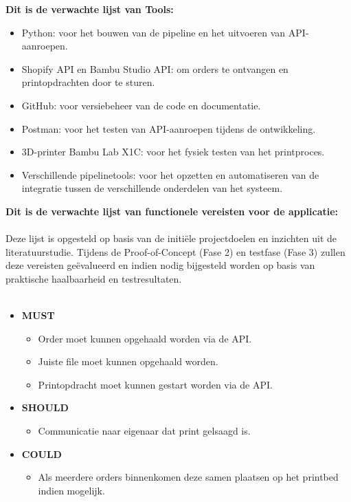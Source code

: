 \vspace{1em}
\textbf{Dit is de verwachte lijst van Tools:}\\
\begin{itemize}
    \item Python: voor het bouwen van de pipeline en het uitvoeren van API-aanroepen.
    \item Shopify API en Bambu Studio API: om orders te ontvangen en printopdrachten door te sturen.
    \item GitHub: voor versiebeheer van de code en documentatie.
    \item Postman: voor het testen van API-aanroepen tijdens de ontwikkeling.
    \item 3D-printer Bambu Lab X1C: voor het fysiek testen van het printproces.
    \item Verschillende pipelinetools: voor het opzetten en automatiseren van de integratie tussen de verschillende onderdelen van het systeem.
\end{itemize}

\vspace{1em}
\textbf{Dit is de verwachte lijst van functionele vereisten voor de applicatie:}
\\\\
Deze lijst is opgesteld op basis van de initiële projectdoelen en inzichten uit de literatuurstudie. Tijdens de Proof-of-Concept (Fase 2) en testfase (Fase 3) zullen deze vereisten geëvalueerd en indien nodig bijgesteld worden op basis van praktische haalbaarheid en testresultaten.
\\\\
\begin{itemize}
    \item \textbf{MUST}
    \begin{itemize}
        \item Order moet kunnen opgehaald worden  via de API.
        \item Juiste file moet kunnen opgehaald worden.
        \item Printopdracht moet kunnen gestart worden via de API.
    \end{itemize}
    \item \textbf{SHOULD}
    \begin{itemize}
        \item Communicatie naar eigenaar dat print gelsaagd is.
    \end{itemize}
    \item \textbf{COULD}
    \begin{itemize}
        \item Als meerdere orders binnenkomen deze samen plaatsen op het printbed indien mogelijk.
    \end{itemize}
\end{itemize}

